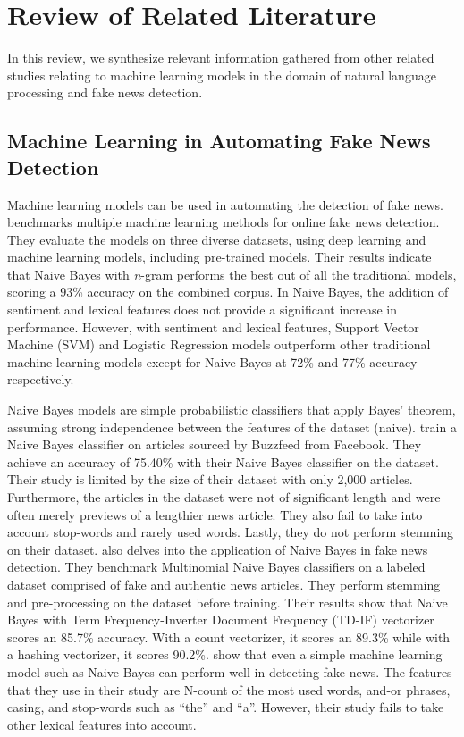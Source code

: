 \chapter{Review of Related Literature}
\label{sec:relatedlit}

In this review, we synthesize relevant information gathered from other related studies relating to machine learning models in the domain of natural language processing and fake news detection.

\section{Machine Learning in Automating Fake News Detection}

Machine learning models can be used in automating the detection of fake news.  benchmarks multiple machine learning methods for online fake news detection. They evaluate the models on three diverse datasets, using deep learning and machine learning models, including pre-trained models. Their results indicate that Naive Bayes with \textit{n}-gram performs the best out of all the traditional models, scoring a 93\% accuracy on the combined corpus. In Naive Bayes, the addition of sentiment and lexical features does not provide a significant increase in performance. However, with sentiment and lexical features, Support Vector Machine (SVM) and Logistic Regression models outperform other traditional machine learning models except for Naive Bayes at 72\% and 77\% accuracy respectively.

Naive Bayes models are simple probabilistic classifiers that apply Bayes' theorem, assuming strong independence between the features of the dataset (naive).  train a Naive Bayes classifier on articles sourced by Buzzfeed from Facebook. They achieve an accuracy of 75.40\% with their Naive Bayes classifier on the dataset. Their study is limited by the size of their dataset with only 2,000 articles. Furthermore, the articles in the dataset were not of significant length and were often merely previews of a lengthier news article. They also fail to take into account stop-words and rarely used words. Lastly, they do not perform stemming on their dataset.  also delves into the application of Naive Bayes in fake news detection. They benchmark Multinomial Naive Bayes classifiers on a labeled dataset comprised of fake and authentic news articles. They perform stemming and pre-processing on the dataset before training. Their results show that Naive Bayes with Term Frequency-Inverter Document Frequency (TD-IF) vectorizer scores an 85.7\% accuracy. With a count vectorizer, it scores an 89.3\% while with a hashing vectorizer, it scores 90.2\%.  show that even a simple machine learning model such as Naive Bayes can perform well in detecting fake news. The features that they use in their study are N-count of the most used words, and-or phrases, casing, and stop-words such as \enquote{the} and \enquote{a}. However, their study fails to take other lexical features into account.


